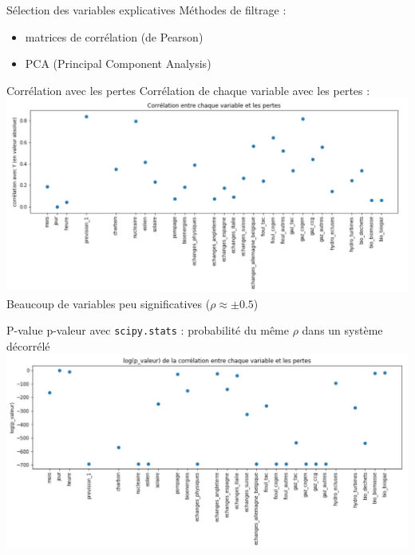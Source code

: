 \begin{frame}{Sélection des variables explicatives}
\protect\hypertarget{suxe9lection-des-variables-explicatives-1}{}
Méthodes de filtrage :

\begin{itemize}
\tightlist
\item
  matrices de corrélation (de Pearson)
\item
  PCA (Principal Component Analysis)
\end{itemize}
\end{frame}

\begin{frame}{Corrélation avec les pertes}
\protect\hypertarget{corruxe9lation-avec-les-pertes}{}
Corrélation de chaque variable avec les pertes :
\includegraphics[scale=.5]{figures/pearson_y.JPG} Beaucoup de variables
peu significatives (\(\rho \approx \pm 0.5\))
\end{frame}

\begin{frame}[fragile]{P-value}
\protect\hypertarget{p-value}{}
p-valeur avec \texttt{scipy.stats} : probabilité du même \(\rho\) dans
un système décorrélé \includegraphics[scale=.5]{figures/log_p_value.JPG}
\end{frame}

